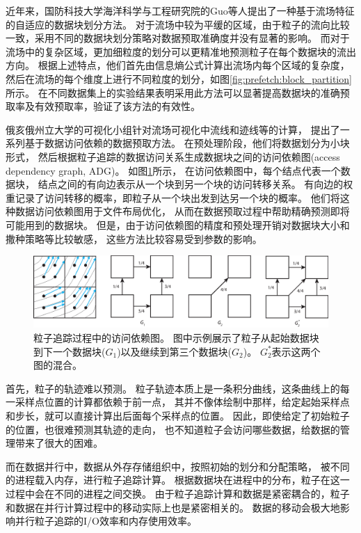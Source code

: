 近年来，国防科技大学海洋科学与工程研究院的Guo等人\parencite{Guo2017WL}提出了一种基于流场特征的自适应的数据块划分方法。
对于流场中较为平缓的区域，由于粒子的流向比较一致，采用不同的数据块划分策略对数据预取准确度并没有显著的影响。
而对于流场中的复杂区域，更加细粒度的划分可以更精准地预测粒子在每个数据块的流出方向。
根据上述特点，他们首先由信息熵公式计算出流场内每个区域的复杂度，然后在流场的每个维度上进行不同粒度的划分，如图\ref{fig:prefetch:block_partition}所示。
在不同数据集上的实验结果表明采用此方法可以显著提高数据块的准确预取率及有效预取率，验证了该方法的有效性。

俄亥俄州立大学的可视化小组针对流场可视化中流线和迹线等的计算，
提出了一系列基于数据访问依赖的数据预取方法\parencite{ChenXLS12,ChenNLS12}。
在预处理阶段，他们将数据划分为小块形式，
然后根据粒子追踪的数据访问关系生成数据块之间的访问依赖图(access dependency graph, ADG)。
如图\ref{fig:background:adg-1st}所示，
在访问依赖图中，每个结点代表一个数据块，
结点之间的有向边表示从一个块到另一个块的访问转移关系。
有向边的权重记录了访问转移的概率，即粒子从一个块出发到达另一个块的概率。
他们将这种数据访问依赖图用于文件布局优化，
从而在数据预取过程中帮助精确预测即将可能用到的数据块。
但是，由于访问依赖图的精度和预处理开销对数据块大小和撒种策略等比较敏感，
这些方法比较容易受到参数的影响。

\begin{figure}[!tb]
  \centering
  \includegraphics[width=\linewidth]{image/prefetch/adg-1st}
  \caption{
    粒子追踪过程中的访问依赖图\cite{ChenXLS12}。
    图中示例展示了粒子从起始数据块到下一个数据块($G_1$)以及继续到第三个数据块($G_2$)。
    $G_2^*$表示这两个图的混合。
  }
  \label{fig:background:adg-1st}
\end{figure}

首先，粒子的轨迹难以预测。
粒子轨迹本质上是一条积分曲线，这条曲线上的每一采样点位置的计算都依赖于前一点，
其并不像体绘制中那样，给定起始采样点和步长，就可以直接计算出后面每个采样点的位置。 
因此，即使给定了初始粒子的位置，也很难预测其轨迹的走向，
也不知道粒子会访问哪些数据，给数据的管理带来了很大的困难。

而在数据并行中，数据从外存存储组织中，按照初始的划分和分配策略，
被不同的进程载入内存，进行粒子追踪计算。
根据数据块在进程中的分布，粒子在这一过程中会在不同的进程之间交换。
由于粒子追踪计算和数据是紧密耦合的，粒子和数据在并行计算过程中的移动实际上也是紧密相关的。
数据的移动会极大地影响并行粒子追踪的I/O效率和内存使用效率。

